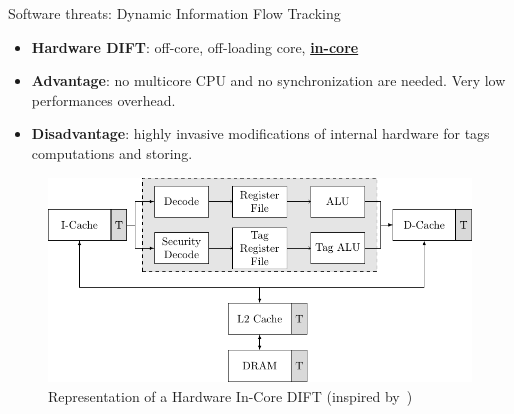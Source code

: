 \begin{frame}{Software threats: Dynamic Information Flow Tracking}
    \begin{minipage}[c]{0.45\textwidth}
        \begin{block}{}
            \begin{itemize}
                [square]
                \justifying
                    \item \textbf{Hardware DIFT}: off-core, off-loading core, \underline{\textbf{in-core}} \cite{DKK-07-sigarch}
            \end{itemize}
        \end{block}
        
        \begin{exampleblock}{}
            \begin{itemize}
                [square]
                \justifying
                \item \textbf{Advantage}: no multicore CPU and no synchronization are needed. Very low performances overhead.
            \end{itemize}
        \end{exampleblock}
        
        \begin{alertblock}{}
            \begin{itemize}
                [square]
                \justifying
                \item \textbf{Disadvantage}: highly invasive modifications of internal hardware for tags computations and storing.
            \end{itemize}
        \end{alertblock}
    \end{minipage}\hfill%
    \begin{minipage}[c]{0.5\textwidth}
        \begin{figure}
            \centering
            \includegraphics[width=\textwidth]{src/1_introduction/img/incore.pdf}
            \caption{Representation of a Hardware In-Core DIFT (inspired by~\cite{KDK-09-dsn})}
            \label{fig:incore}
        \end{figure}
    \end{minipage}
\end{frame}
